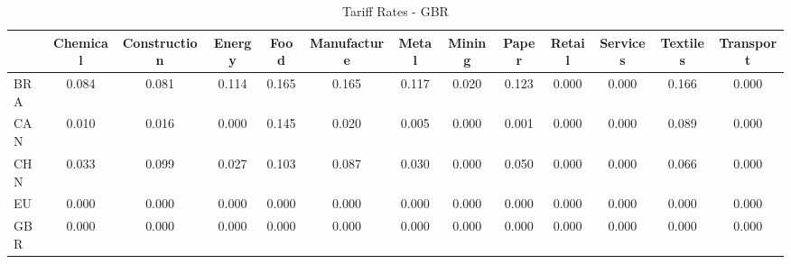 \begin{table}[htbp]
\centering
\caption{Tariff Rates - GBR} 
\label{tab:tariffs_GBR}
\begin{tabular}{lcccccccccccc}
  \hline
 & Chemical & Construction & Energy & Food & Manufacture & Metal & Mining & Paper & Retail & Services & Textiles & Transport \\ 
  \hline
BRA & \textcolor[RGB]{36,23,219}{0.084} & \textcolor[RGB]{40,26,215}{0.081} & \textcolor[RGB]{21,14,234}{0.114} & \textcolor[RGB]{8,5,246}{0.165} & \textcolor[RGB]{6,4,249}{0.165} & \textcolor[RGB]{17,11,238}{0.117} & \textcolor[RGB]{96,62,159}{0.020} & \textcolor[RGB]{15,10,240}{0.123} & \textcolor[RGB]{255,165,0}{0.000} & \textcolor[RGB]{255,165,0}{0.000} & \textcolor[RGB]{4,3,251}{0.166} & \textcolor[RGB]{255,165,0}{0.000} \\ 
  CAN & \textcolor[RGB]{106,69,149}{0.010} & \textcolor[RGB]{98,63,157}{0.016} & \textcolor[RGB]{123,80,132}{0.000} & \textcolor[RGB]{11,7,244}{0.145} & \textcolor[RGB]{94,61,162}{0.020} & \textcolor[RGB]{110,72,144}{0.005} & \textcolor[RGB]{255,165,0}{0.000} & \textcolor[RGB]{121,78,134}{0.001} & \textcolor[RGB]{255,165,0}{0.000} & \textcolor[RGB]{255,165,0}{0.000} & \textcolor[RGB]{30,19,225}{0.089} & \textcolor[RGB]{255,165,0}{0.000} \\ 
  CHN & \textcolor[RGB]{79,51,176}{0.033} & \textcolor[RGB]{28,18,227}{0.099} & \textcolor[RGB]{85,55,170}{0.027} & \textcolor[RGB]{25,16,230}{0.103} & \textcolor[RGB]{32,21,223}{0.087} & \textcolor[RGB]{81,52,174}{0.030} & \textcolor[RGB]{255,165,0}{0.000} & \textcolor[RGB]{57,37,198}{0.050} & \textcolor[RGB]{255,165,0}{0.000} & \textcolor[RGB]{255,165,0}{0.000} & \textcolor[RGB]{49,32,206}{0.066} & \textcolor[RGB]{255,165,0}{0.000} \\ 
  EU & \textcolor[RGB]{255,165,0}{0.000} & \textcolor[RGB]{255,165,0}{0.000} & \textcolor[RGB]{255,165,0}{0.000} & \textcolor[RGB]{255,165,0}{0.000} & \textcolor[RGB]{255,165,0}{0.000} & \textcolor[RGB]{255,165,0}{0.000} & \textcolor[RGB]{255,165,0}{0.000} & \textcolor[RGB]{255,165,0}{0.000} & \textcolor[RGB]{255,165,0}{0.000} & \textcolor[RGB]{255,165,0}{0.000} & \textcolor[RGB]{255,165,0}{0.000} & \textcolor[RGB]{255,165,0}{0.000} \\ 
  GBR & \textcolor[RGB]{255,165,0}{0.000} & \textcolor[RGB]{255,165,0}{0.000} & \textcolor[RGB]{255,165,0}{0.000} & \textcolor[RGB]{255,165,0}{0.000} & \textcolor[RGB]{255,165,0}{0.000} & \textcolor[RGB]{255,165,0}{0.000} & \textcolor[RGB]{255,165,0}{0.000} & \textcolor[RGB]{255,165,0}{0.000} & \textcolor[RGB]{255,165,0}{0.000} & \textcolor[RGB]{255,165,0}{0.000} & \textcolor[RGB]{255,165,0}{0.000} & \textcolor[RGB]{255,165,0}{0.000} \\ 

\end{tabular}
\end{table}
